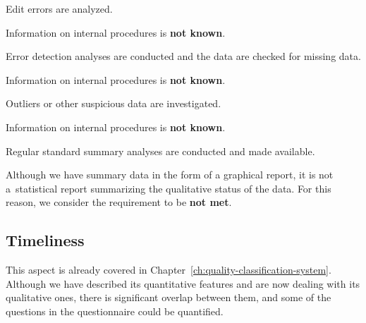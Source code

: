 \begin{QandA}
    \item Edit errors are analyzed.
    \begin{answered}
        Information on internal procedures is \textbf{not known}.
    \end{answered}

    \item Error detection analyses are conducted and the data are checked for missing data.
    \begin{answered}
        Information on internal procedures is \textbf{not known}.
    \end{answered}

    \item Outliers or other suspicious data are investigated.
    \begin{answered}
        Information on internal procedures is \textbf{not known}.
    \end{answered}

    \item Regular standard summary analyses are conducted and made available.
    \begin{answered}
        Although we have summary data in the form of a graphical report, it is not a~statistical report summarizing the qualitative status of the data.
        For this reason, we consider the requirement to be \textbf{not met}.
    \end{answered}

\end{QandA}

\newpage
\subsection{Timeliness}

This aspect is already covered in Chapter~\ref{ch:quality-classification-system}.
Although we have described its quantitative features and are now dealing with its qualitative ones, there is significant overlap between them, and some of the questions in the questionnaire could be quantified.

